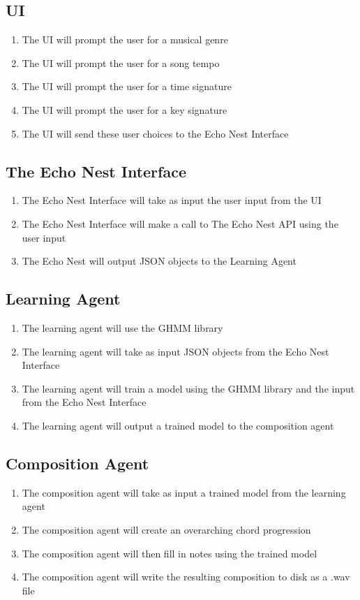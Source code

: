 \documentclass{article}
\begin{document}
\subsection{UI}
\begin{enumerate}
\item The UI will prompt the user for a musical genre
\item The UI will prompt the user for a song tempo
\item The UI will prompt the user for a time signature
\item The UI will prompt the user for a key signature
\item The UI will send these user choices to the Echo Nest Interface
\end{enumerate}

\subsection{The Echo Nest Interface}
\begin{enumerate}
\item The Echo Nest Interface will take as input the user input from the UI
\item The Echo Nest Interface will make a call to The Echo Nest API using the user input
\item The Echo Nest will output JSON objects to the Learning Agent
\end{enumerate}

\subsection{Learning Agent}
\begin{enumerate}
\item The learning agent will use the GHMM library
\item The learning agent will take as input JSON objects from the Echo Nest Interface
\item The learning agent will train a model \cite{GHMM} using the GHMM library and the input from the Echo Nest Interface
\item The learning agent will output a trained model to the composition agent
\end{enumerate}

\subsection{Composition Agent}
\begin{enumerate}
\item The composition agent will take as input a trained model from the learning agent
\item The composition agent will create an overarching chord progression
\item The composition agent will then fill in notes using the trained model
\item The composition agent will write the resulting composition to disk as a .wav file
\end{enumerate}
\end{document}
